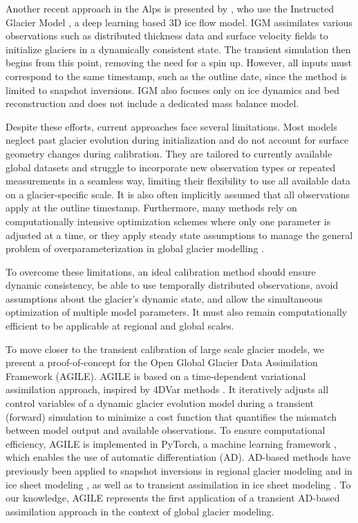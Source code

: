 \documentclass[journal abbreviation, manuscript]{copernicus}
\begin{document}
Another recent approach in the Alps is presented by \citet{Cook2023}, who use the Instructed Glacier Model \citep[IGM;][]{Jouvet2022}, a deep learning based 3D ice flow model. IGM assimilates various observations such as distributed thickness data \citep[GlaThiDa;][]{Welty2020} and surface velocity fields \citep{Millan2022} to initialize glaciers in a dynamically consistent state. The transient simulation then begins from this point, removing the need for a spin up. However, all inputs must correspond to the same timestamp, such as the outline date, since the method is limited to snapshot inversions. IGM also focuses only on ice dynamics and bed reconstruction and does not include a dedicated mass balance model.

Despite these efforts, current approaches face several limitations. Most models neglect past glacier evolution during initialization and do not account for surface geometry changes during calibration. They are tailored to currently available global datasets and struggle to incorporate new observation types or repeated measurements in a seamless way, limiting their flexibility to use all available data on a glacier-specific scale. It is also often implicitly assumed that all observations apply at the outline timestamp. Furthermore, many methods rely on computationally intensive optimization schemes where only one parameter is adjusted at a time, or they apply steady state assumptions to manage the general problem of overparameterization in global glacier modelling \citep[e.g.,][]{Rounce2020}.

To overcome these limitations, an ideal calibration method should ensure dynamic consistency, be able to use temporally distributed observations, avoid assumptions about the glacier’s dynamic state, and allow the simultaneous optimization of multiple model parameters. It must also remain computationally efficient to be applicable at regional and global scales.

To move closer to the transient calibration of large scale glacier models, we present a proof-of-concept for the Open Global Glacier Data Assimilation Framework (AGILE). AGILE is based on a time-dependent variational assimilation approach, inspired by 4DVar methods \citep[][]{Lorenc1997}. It iteratively adjusts all control variables of a dynamic glacier evolution model during a transient (forward) simulation to minimize a cost function that quantifies the mismatch between model output and available observations. To ensure computational efficiency, AGILE is implemented in PyTorch, a machine learning framework \citep[][]{PyTorch}, which enables the use of automatic differentiation (AD). AD-based methods have previously been applied to snapshot inversions in regional glacier modeling \citep[][]{Cook2023} and in ice sheet modeling \citep[][]{Brinkerhoff2013}, as well as to transient assimilation in ice sheet modeling \citep[][]{Goldberg2013, Recinos2023}. To our knowledge, AGILE represents the first application of a transient AD-based assimilation approach in the context of global glacier modeling.
\end{document}
